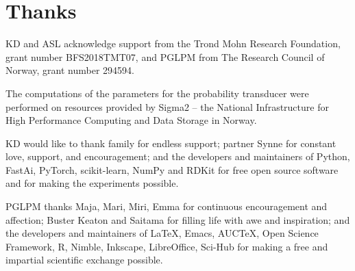 \documentclass[\ifafour a4paper,12pt,\else a5paper,10pt,\fi%
onecolumn,oneside,article,%
british%
]{memoir}
\theoremstyle{remark}
\theoremstyle{innote}
\renewcommand*{\finalnamedelim}{\addspace\amp\space}
\newcommand*{\amp}{\&}
\newenvironment{acknowledgements}{\section*{Thanks}\addcontentsline{toc}{section}{Thanks}}{\par}
\newcommand*\autanet{\texttt{[image: autanet.pdf]}}
\renewcommand*{\|}[1][]{\nonscript\:#1\vert\nonscript\:\mathopen{}}
\begin{document}
\begin{acknowledgements}
  KD and ASL acknowledge support from the Trond Mohn Research Foundation, grant number BFS2018TMT07, and PGLPM from The Research Council of Norway, grant number 294594.

  The computations of the parameters for the probability transducer were performed on resources provided by Sigma2 -- the National Infrastructure for High Performance Computing and Data Storage in Norway.

  KD would like to thank family for endless support; partner Synne for constant love, support, and encouragement; and the developers and maintainers of Python, FastAi, PyTorch, scikit-learn, NumPy and RDKit for free open source software and for making the experiments possible. 

  PGLPM thanks Maja, Mari, Miri, Emma for continuous encouragement and affection;  Buster Keaton and Saitama for filling life with awe and inspiration; and the developers and maintainers of \LaTeX, Emacs, AUC\TeX, Open Science Framework, R, Nimble, Inkscape, LibreOffice, Sci-Hub for making a free and impartial scientific exchange possible.
\end{acknowledgements}



\renewcommand*{\finalnamedelim}{\addcomma\space}

\printbibliography[prenote=prenote%
]
\end{document}
